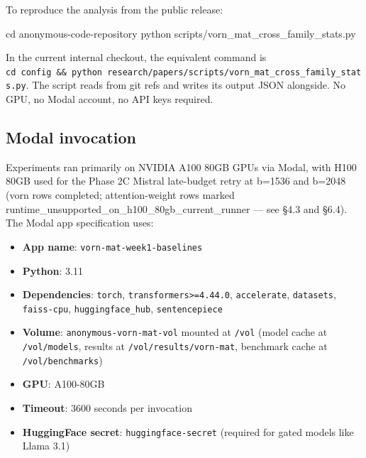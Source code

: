 \documentclass[10pt]{article}
\newenvironment{Shaded}{}{}
\newcommand{\BuiltInTok}[1]{\textcolor[rgb]{0.00,0.50,0.00}{#1}}
\newcommand{\ExtensionTok}[1]{#1}
\newcommand{\NormalTok}[1]{#1}
\providecommand{\tightlist}{%
 \setlength{\itemsep}{0pt}\setlength{\parskip}{0pt}}
\begin{document}
To reproduce the analysis from the public release:

\begin{Shaded}
\begin{Highlighting}[]
\BuiltInTok{cd}\NormalTok{ anonymous-code-repository}
\ExtensionTok{python}\NormalTok{ scripts/vorn\_mat\_cross\_family\_stats.py}
\end{Highlighting}
\end{Shaded}

In the current internal checkout, the equivalent command is
\texttt{cd\ config\ \&\&\ python\ research/\allowbreak{}papers/\allowbreak{}scripts/\allowbreak{}vorn\_mat\_cross\_family\_stats.\allowbreak{}py}.
The script reads from git refs and writes its output JSON alongside. No
GPU, no Modal account, no API keys required.

\subsection{Modal invocation}\label{a4-modal-invocation}

Experiments ran primarily on NVIDIA A100 80GB GPUs via Modal, with H100
80GB used for the Phase 2C Mistral late-budget retry at b=1536 and
b=2048 (vorn rows completed; attention-weight rows marked
runtime\_unsupported\_on\_h100\_80gb\_current\_runner --- see \S{}4.3 and
\S{}6.4). The Modal app specification uses:

\begin{itemize}
\tightlist
\item
 \textbf{App name}: \texttt{vorn-mat-week1-baselines}
\item
 \textbf{Python}: 3.11
\item
 \textbf{Dependencies}: \texttt{torch},
 \texttt{transformers\textgreater{}=4.44.0}, \texttt{accelerate},
 \texttt{datasets}, \texttt{faiss-cpu}, \texttt{huggingface\_hub},
 \texttt{sentencepiece}
\item
 \textbf{Volume}: \texttt{anonymous-vorn-mat-vol} mounted at \texttt{/vol}
 (model cache at \texttt{/vol/models}, results at
 \texttt{/vol/results/vorn-mat}, benchmark cache at
 \texttt{/vol/benchmarks})
\item
 \textbf{GPU}: A100-80GB
\item
 \textbf{Timeout}: 3600 seconds per invocation
\item
 \textbf{HuggingFace secret}: \texttt{huggingface-secret} (required for
 gated models like Llama 3.1)
\end{itemize}
\end{document}
